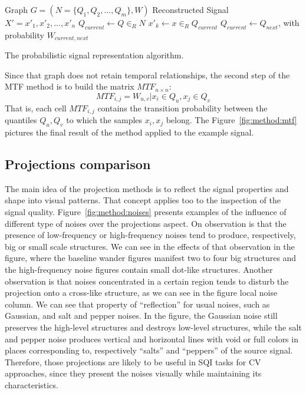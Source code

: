 \begin{algorithm}
    \begin{algorithmic}
        \Require Graph $G=(N=\{Q_1, Q_2, ..., Q_m\},W)$
        \Ensure Reconstructed Signal $X'=x'_1,x'_2,...,x'_n$
        \State $Q_{current} \gets Q \in_R N$ 
            \State $x'_k \gets x \in_R Q_{current}$
            \State $Q_{current} \gets Q_{next}$, with probability $W_{current,next}$
        \EndFor
    \end{algorithmic}
    \caption{The probabilistic signal representation algorithm. }
    \label{alg:mtf_reconstruction}
\end{algorithm}

Since that graph does not retain temporal relationships, the second step of the \gls{MTF} method is to build the matrix $MTF_{n \times n}$:
\begin{equation}
    MTF_{i,j} = W_{u,v} | x_i \in Q_u, x_j \in Q_v
\end{equation}
\noindent That is, each cell $MTF_{i,j}$ contains the transition probability between the quantiles $Q_u,Q_v$ to which the samples $x_i,x_j$ belong. The Figure~\ref{fig:method:mtf} pictures the final result of the method applied to the example signal. 



\subsection{Projections comparison}

The main idea of the projection methods is to reflect the signal properties and shape into visual patterns. That concept applies too to the inspection of the signal quality. Figure~\ref{fig:method:noises} presents examples of the influence of different type of noises over the projections aspect. On observation is that the presence of low-frequency or high-frequency noises tend to produce, respectively, big or small scale structures. We can see in the effects of that observation in the figure, where the baseline wander figures manifest two to four big structures and the high-frequency noise figures contain small dot-like structures. Another observation is that noises concentrated in a certain region tends to disturb the projection onto a cross-like structure, as we can see in the figure local noise column. We can see that property of ``reflection'' for usual noises, such as Gaussian, and salt and pepper noises. In the figure, the Gaussian noise still preserves the high-level structures and destroys low-level structures, while the salt and pepper noise produces vertical and horizontal lines with void or full colors in places corresponding to, respectively ``salts'' and ``peppers'' of the source signal. Therefore, those projections are likely to be useful in \gls{SQI} tasks for \gls{CV} approaches, since they present the noises visually while maintaining its characteristics.  

